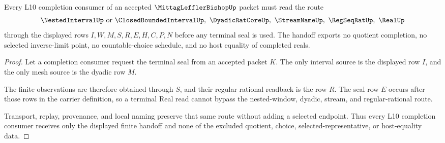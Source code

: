 \begin{theorem}
\label{thm:mittag-leffler-bishop-l10-handoff}
Every L10 completion consumer of an accepted $\MittagLefflerBishopUp$ packet must read the route
$$
\NestedIntervalUp\ \hbox{or}\ \ClosedBoundedIntervalUp,\ \DyadicRatCoreUp,\ \StreamNameUp,\ \RegSeqRatUp,\ \RealUp
$$
through the displayed rows $I,W,M,S,R,E,H,C,P,N$ before any terminal seal is used. The handoff exports no quotient completion, no selected inverse-limit point, no countable-choice schedule, and no host equality of completed reals.
\end{theorem}
\begin{proof}
Let a completion consumer request the terminal seal from an accepted packet $K$. The only interval source is the displayed row $I$, and the only mesh source is the dyadic row $M$.

The finite observations are therefore obtained through $S$, and their regular rational readback is the row $R$. The seal row $E$ occurs after those rows in the carrier definition, so a terminal Real read cannot bypass the nested-window, dyadic, stream, and regular-rational route.

Transport, replay, provenance, and local naming preserve that same route without adding a selected endpoint. Thus every L10 completion consumer receives only the displayed finite handoff and none of the excluded quotient, choice, selected-representative, or host-equality data.
\end{proof}



